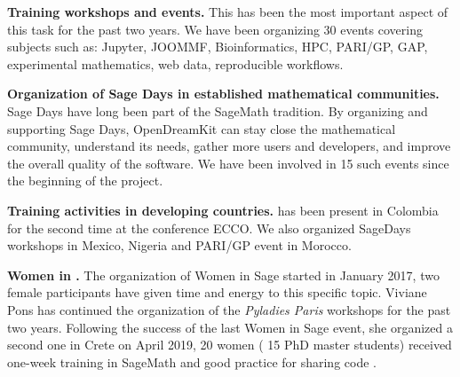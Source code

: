 \begin{compactitem}
\item \textbf{Training workshops and events.} This has been the most important aspect of this task
for the past two years. We have been organizing 30 events covering subjects such as: Jupyter, JOOMMF,
Bioinformatics, HPC, PARI/GP, GAP, experimental mathematics, web data, reproducible workflows.
\item \textbf{Organization of Sage Days in established mathematical communities.} Sage Days have long been
part of the SageMath tradition. By organizing and supporting Sage Days, OpenDreamKit can stay close
the mathematical community, understand its needs, gather more users and developers, and improve
the overall quality of the software. We have been involved in 15 such events since the beginning
of the project.
\item \textbf{Training activities in developing countries.} \ODK has been present in Colombia for the second time at
the conference ECCO. We also organized SageDays workshops in Mexico, Nigeria and PARI/GP event in Morocco.
\item \textbf{Women in \ODK.} The organization of Women in Sage started in January 2017, two female \ODK participants
have given time and energy to this specific topic. Viviane Pons has continued the organization of the \textit{Pyladies Paris} workshops for the past two years. Following the success of the last Women in Sage event, she organized a second one in Crete on April 2019, 20 women ( 15 PhD master students) received one-week training in SageMath and good practice for sharing code . 
\end{compactitem}
